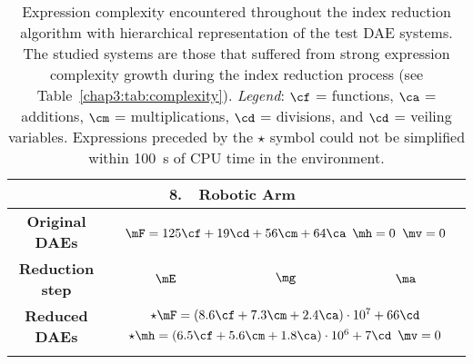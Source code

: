 {\scriptsize
\setlength{\tabcolsep}{0.0pt}
\setlength{\LTleft}{0.0cm}
\setlength{\LTright}{0.0cm}
\setlength{\LTcapwidth}{\textwidth}
\centering\begin{longtable}{cccc}
  \caption[
    Expression complexity encountered throughout the index reduction algorithm with hierarchical representation of the test \ac{DAE} systems.
  ]{
    Expression complexity encountered throughout the index reduction algorithm with hierarchical representation of the test \ac{DAE} systems. The studied systems are those that suffered from strong expression complexity growth during the index reduction process (see Table~\ref{chap3:tab:complexity}). \emph{Legend}: $\cf$ = functions, $\ca$ = additions, $\cm$ = multiplications, $\cd$ = divisions, and $\cd$ = veiling variables. Expressions preceded by the $\star$ symbol could not be simplified within \SI{100}{\second} of \ac{CPU} time in the \Maple{} environment.
  }
  \label{chap3:tab:complexity_veil}
  \endfirsthead
  \endhead
  \multicolumn{4}{c}{\textbf{8.~~Robotic Arm~\cite{pryce1998solving}}} \\
  \toprule
  \textbf{Original \acp{DAE}} & \multicolumn{3}{c}{$\mF = 125\cf + 19\cd + 56\cm + 64\ca$ \quad $\mh = 0$ \quad $\mv = 0$} \\
  \midrule
  \textbf{Reduction step} & $\mE$ & $\mg$ & $\ma$ \\
  \midrule
  \midrule
  \textbf{Reduced \acp{DAE}} & \multicolumn{3}{c}{$\star \mF = (8.6\cf + 7.3\cm + 2.4\ca)\cdot10^{7} + 66\cd$ \quad $\star \mh = (6.5\cf + 5.6\cm + 1.8\ca)\cdot10^{6} + 7\cd$ \quad $\mv = 0$} \\
  \bottomrule \\[-0.1em]

\end{longtable}}
